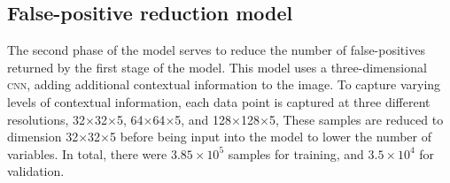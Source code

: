 %
%
%
%
%
%
%
%
%
%
%
%
%
%
%
%
%
%
%

\subsection*{False-positive reduction model}

The second phase of the model serves to reduce the number of false-positives returned by the first stage of the model. This model uses a three-dimensional \textsc{cnn}, adding additional contextual information to the image. To capture varying levels of contextual information, each data point is captured at three different resolutions, 32$\times$32$\times$5, 64$\times$64$\times$5, and 128$\times$128$\times$5,  These samples are reduced to dimension 32$\times$32$\times$5 before being input into the model to lower the number of variables. In total, there were $3.85\times10^5$ samples for training, and $3.5\times10^4$ for validation. 

